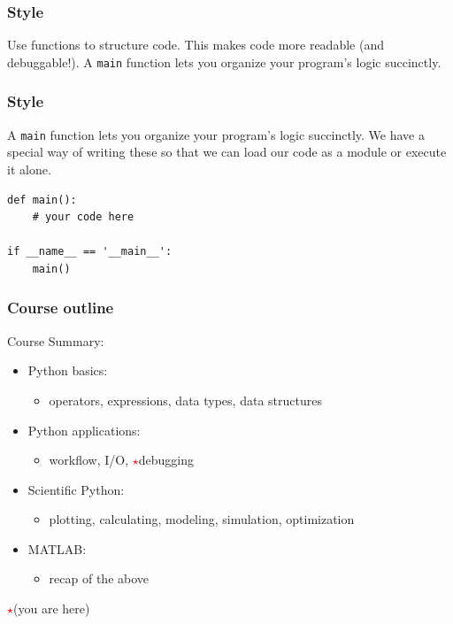 \documentclass[11pt]{beamer}
\newcommand{\correctstar}{\textcolor{red}{$\star$}}
\begin{document}
\begin{frame}[fragile]
  \frametitle{Style}
  \Enlarge

  \begin{enumerate}
  \myitem  Use functions to structure code.
  \myitem  This makes code more readable (and debuggable!).
  \myitem  A \texttt{main} function lets you organize your program's logic succinctly.
  \end{enumerate}
\end{frame}

\begin{frame}[fragile]
  \frametitle{Style}
  \Enlarge

  \begin{enumerate}
  \myitem  A \texttt{main} function lets you organize your program's logic succinctly.
  \myitem  We have a special way of writing these so that we can load our code as a module or execute it alone.
  \end{enumerate}
  \begin{Verbatim}
def main():
    # your code here

if __name__ == '__main__':
    main()
  \end{Verbatim}
\end{frame}


\begin{frame}
  \frametitle{Course outline}
  \Enlarge

  Course Summary:
  \begin{itemize}
  \item  Python basics:
    \begin{itemize}
    \item  operators, expressions, data types, data structures
    \end{itemize}
  \item  Python applications:
    \begin{itemize}
    \item  workflow, I/O, \correctstar debugging
    \end{itemize}
  \item  Scientific Python:
    \begin{itemize}
    \item  plotting, calculating, modeling, simulation, optimization
    \end{itemize}
  \item  MATLAB:
    \begin{itemize}
    \item  recap of the above
    \end{itemize}
  \end{itemize}

  \correctstar (you are here)
\end{frame}
\end{document}
